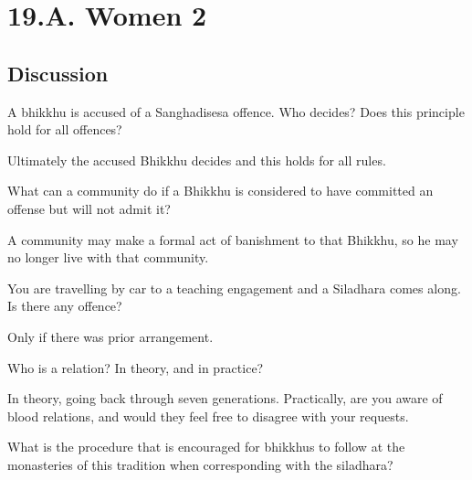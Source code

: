 \chapter{19.A. Women 2}
\renewcommand*{\theChapterTitle}{19.A. Women 2}

\section*{Discussion}


A bhikkhu is accused of a Sanghadisesa offence. Who decides? Does this principle hold for all offences?

\begin{solution}
  Ultimately the accused Bhikkhu decides and this holds for all rules. 
\end{solution}

\bigskip

What can a community do if a Bhikkhu is considered to have committed an offense but will not admit it?

\begin{solution}
  A community may make a formal act of banishment to that Bhikkhu, so he may no
  longer live with that community.
\end{solution}

\bigskip


You are travelling by car to a teaching engagement and a Siladhara comes along. Is there any offence?

\begin{solution}
  Only if there was prior arrangement.
\end{solution}

\bigskip

Who is a relation? In theory, and in practice?

\begin{solution}
  In theory, going back through seven generations. Practically, are you aware of
  blood relations, and would they feel free to disagree with your requests.
\end{solution}

\bigskip

What is the procedure that is encouraged for bhikkhus to follow at the monasteries of this tradition 
when corresponding with the siladhara?

